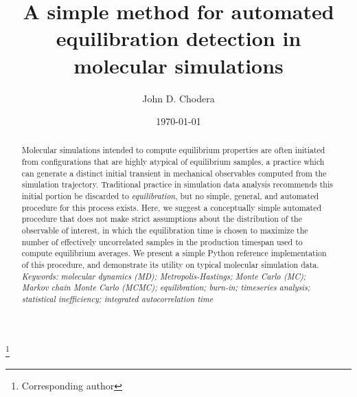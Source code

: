 \documentclass[aps,pre,twocolumn,nofootinbib,superscriptaddress,linenumbers,11point]{revtex4-1}
\begin{document}

\title{A simple method for automated equilibration detection in molecular simulations}

\author{John D. Chodera}
 \thanks{Corresponding author}

\date{\today}


\begin{abstract}

Molecular simulations intended to compute equilibrium properties are often initiated from configurations that are highly atypical of equilibrium samples, a practice which can generate a distinct initial transient in mechanical observables computed from the simulation trajectory.
Traditional practice in simulation data analysis recommends this initial portion be discarded to \emph{equilibration}, but no simple, general, and automated procedure for this process exists.
Here, we suggest a conceptually simple automated procedure that does not make strict assumptions about the distribution of the observable of interest, in which the equilibration time is chosen to maximize the number of effectively uncorrelated samples in the production timespan used to compute equilibrium averages.
We present a simple Python reference implementation of this procedure, and demonstrate its utility on typical molecular simulation data.\\

\emph{Keywords: molecular dynamics (MD); Metropolis-Hastings; Monte Carlo (MC); Markov chain Monte Carlo (MCMC); equilibration; burn-in; timeseries analysis; statistical inefficiency; integrated autocorrelation time}

\end{abstract}

\maketitle


\end{document}
